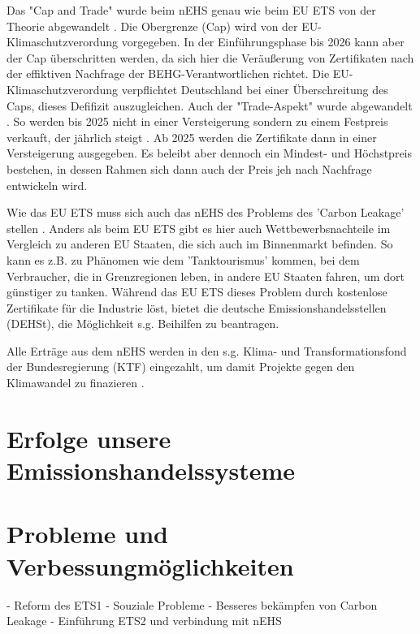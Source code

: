 Das "Cap and Trade" wurde beim nEHS genau wie beim EU ETS von der Theorie abgewandelt \cite{dehst.2023}. Die Obergrenze (Cap) wird von der EU-Klimaschutzverordung vorgegeben. 
In der Einführungsphase bis 2026 kann aber der Cap überschritten werden, da sich hier die Veräußerung von Zertifikaten nach der effiktiven Nachfrage der BEHG-Verantwortlichen richtet.
Die EU-Klimaschutzverordung verpflichtet Deutschland bei einer Überschreitung des Caps, dieses Defifizit auszugleichen. Auch der "Trade-Aspekt" wurde abgewandelt \cite{dehst.2023}. 
So werden bis 2025 nicht in einer Versteigerung sondern zu einem Festpreis verkauft, der jährlich steigt . 
Ab 2025 werden die Zertifikate dann in einer Versteigerung ausgegeben. 
Es beleibt aber dennoch ein Mindest- und Höchstpreis bestehen, in dessen Rahmen sich dann auch der Preis jeh nach Nachfrage entwickeln wird.

Wie das EU ETS muss sich auch das nEHS des Problems des 'Carbon Leakage' stellen \cite{dehst2.2023}. Anders als beim EU ETS gibt es hier auch Wettbewerbsnachteile im Vergleich zu anderen EU Staaten, die sich auch im Binnenmarkt befinden. 
So kann es z.B. zu Phänomen wie dem 'Tanktourismus' kommen, bei dem Verbraucher, die in Grenzregionen leben, in andere EU Staaten fahren, um dort günstiger zu tanken. 
Während das EU ETS dieses Problem durch kostenlose Zertifikate für die Industrie löst, bietet die deutsche Emissionshandelsstellen (DEHSt), die Möglichkeit s.g. Beihilfen zu beantragen.

Alle Erträge aus dem nEHS werden in den s.g. Klima- und Transformationsfond der Bundesregierung (KTF) eingezahlt, um damit Projekte gegen den Klimawandel zu finazieren \cite{dehst.2023}.

\section{Erfolge unsere Emissionshandelssysteme}



\section{Probleme und Verbessungmöglichkeiten}
- Reform des ETS1
- Souziale Probleme
- Besseres bekämpfen von Carbon Leakage
- Einführung ETS2 und verbindung mit nEHS





